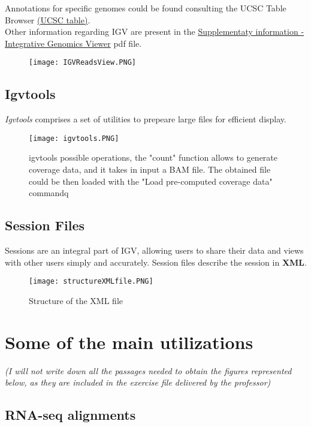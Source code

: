 Annotations for specific genomes could be found consulting the UCSC Table
Browser \href{http://genome.ucsc.edu/cgi-bin/hgTables}{(UCSC table)}.\\

Other information regarding IGV are present in the
\href{https://authors.library.caltech.edu/72234/2/nbt.1754-S1.pdf}{Supplementaty
information - Integrative Genomics Viewer} pdf file.

\begin{figure}[H]
    \caption{}
    \centering
    \texttt{[image: IGVReadsView.PNG]}
    \label{ViewReads}
\end{figure}


\subsection{Igvtools}
\textit{Igvtools} comprises a set of utilities to prepeare large files for efficient
display.

\begin{figure}[H]
    \caption{igvtools possible operations, the "count" function allows to generate coverage data, and it takes in input a BAM file. The obtained
    file could be then loaded with the "Load pre-computed coverage data" commandq}
    \centering
    \texttt{[image: igvtools.PNG]}
\end{figure}

\subsection{Session Files}
Sessions are an integral part of IGV, allowing users to share their data and
views with other users simply and accurately. Session files describe the session
in \textbf{XML}.

\begin{figure}[H]
    \caption{Structure of the XML file}
    \centering
    \texttt{[image: structureXMLfile.PNG]}
    \label{XMLfile}
\end{figure}


\section{Some of the main utilizations}
\textit{(I will not write down all the passages needed to obtain the figures
represented below, as they are included in the exercise file delivered by the
professor)}

\subsection{RNA-seq alignments}

